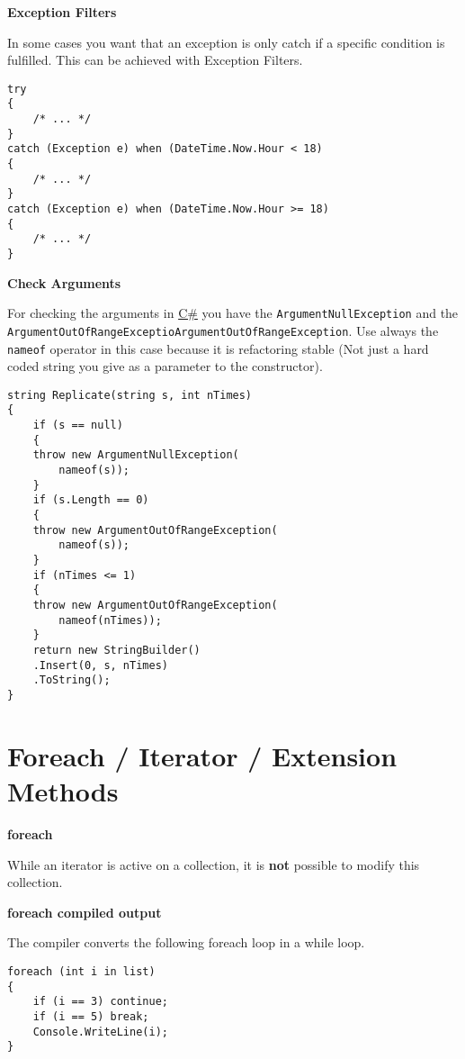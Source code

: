 \documentclass[11pt,twoside,landscape]{article}
\begin{document}
\begin{multicols}{3}
\textbf{Exception Filters}

In some cases you want that an exception is only catch if a specific condition is fulfilled.
This can be achieved with Exception Filters.

\lstset{language=csharp,label= ,caption= ,captionpos=b,numbers=none}
\begin{lstlisting}
try
{
    /* ... */
}
catch (Exception e) when (DateTime.Now.Hour < 18)
{
    /* ... */
}
catch (Exception e) when (DateTime.Now.Hour >= 18)
{
    /* ... */
}
\end{lstlisting}

\textbf{Check Arguments}

For checking the arguments in \href{../../../roam/20211003114158-c.org}{C\#} you have the \texttt{ArgumentNullException} and the \texttt{ArgumentOutOfRangeExceptioArgumentOutOfRangeException}.
Use always the \texttt{nameof} operator in this case because it is refactoring stable (Not just a hard coded string you give as a parameter to the constructor).

\lstset{language=csharp,label= ,caption= ,captionpos=b,numbers=none}
\begin{lstlisting}
string Replicate(string s, int nTimes)
{
    if (s == null)
    {
	throw new ArgumentNullException(
	    nameof(s));
    }
    if (s.Length == 0)
    {
	throw new ArgumentOutOfRangeException(
	    nameof(s));
    }
    if (nTimes <= 1)
    {
	throw new ArgumentOutOfRangeException(
	    nameof(nTimes));
    }
    return new StringBuilder()
	.Insert(0, s, nTimes)
	.ToString();
}
\end{lstlisting}

\section{Foreach / Iterator / Extension Methods}
\label{sec:orgf3eac76}

\textbf{foreach}

While an iterator is active on a collection, it is \textbf{not} possible to modify this collection.

\textbf{foreach compiled output}

The compiler converts the following foreach loop in a while loop.

\lstset{language=csharp,label= ,caption= ,captionpos=b,numbers=none}
\begin{lstlisting}
foreach (int i in list)
{
    if (i == 3) continue;
    if (i == 5) break;
    Console.WriteLine(i);
}
\end{lstlisting}


\end{multicols}
\end{document}
